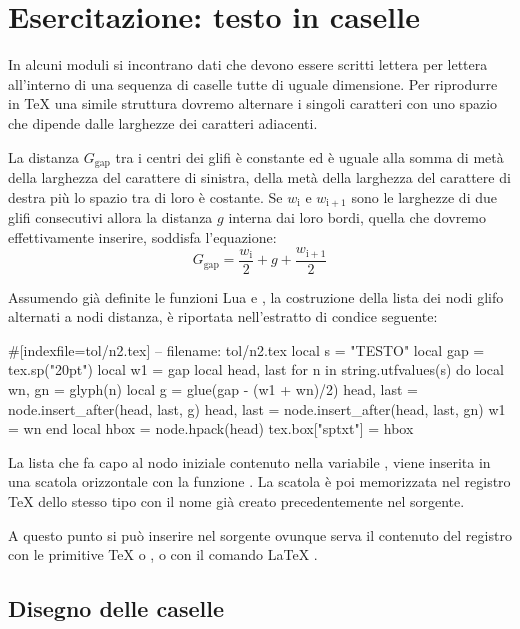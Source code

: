 \section{Esercitazione: testo in caselle}

In alcuni moduli si incontrano dati che devono essere scritti lettera per
lettera all'interno di una sequenza di caselle tutte di uguale dimensione. Per
riprodurre in \TeX{} una simile struttura dovremo alternare i singoli caratteri
con uno spazio che dipende dalle larghezze dei caratteri adiacenti.

La distanza \( G_\mathrm{gap} \) tra i centri dei glifi è constante ed è uguale
alla somma di metà della larghezza del carattere di sinistra, della metà della
larghezza del carattere di destra più lo spazio tra di loro è costante. Se
\(w_\mathrm{i} \) e \(w_\mathrm{i+1} \) sono le larghezze di due glifi
consecutivi allora la distanza \( g \) interna dai loro bordi, quella che
dovremo effettivamente inserire, soddisfa l'equazione:
\[
    G_\mathrm{gap} = \frac{w_\mathrm{i}}{2} + g + \frac{w_\mathrm{i+1}}{2}
\]

Assumendo già definite le funzioni Lua  e , la costruzione
della lista dei nodi glifo alternati a nodi distanza, è riportata nell'estratto
di condice seguente:
\begin{lines}
#[indexfile=tol/n2.tex]
-- filename: tol/n2.tex
local s = "TESTO"
local gap = tex.sp("20pt")
local w1 = gap
local head, last
for n in string.utfvalues(s) do
    local wn, gn = glyph(n)
    local g = glue(gap - (w1 + wn)/2)
    head, last = node.insert_after(head, last, g)
    head, last = node.insert_after(head, last, gn)
    w1 = wn
end
local hbox = node.hpack(head)
tex.box["sptxt"] = hbox
\end{lines}

La lista che fa capo al nodo iniziale contenuto nella variabile ,
viene inserita in una scatola orizzontale con la funzione
. La scatola è poi memorizzata nel registro
\TeX{} dello stesso tipo con il nome  già creato precedentemente
nel sorgente.

A questo punto si può inserire nel sorgente ovunque serva il contenuto del
registro con le primitive \TeX{}  o , o con il comando \LaTeX{}
.


\subsection{Disegno delle caselle}

